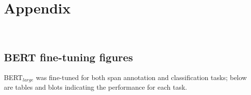 %
%
\begingroup

\appendix
{}

\renewcommand{\cleardoublepage}{}
\renewcommand{\clearpage}{}
\chapter{Appendix}\label{chap:appdx}

\label{sec:appendix}
\listoffigures
\listoftables

\clearpage
\newpage
\mbox{~}
\clearpage
\newpage

\small

\section{BERT fine-tuning figures}
\label{apdx:BERT_fine_tuning_span_annotation_sec}

BERT$_{large}$ was fine-tuned for both span annotation and classification tasks; below are tables and blots indicating the performance for each task.

